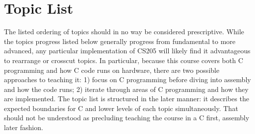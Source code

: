 \documentclass[12pt,letterpaper]{article}
\begin{document}
	\clearpage
	

	\section{Topic List}

		
	

	The listed ordering of topics should in no way be considered prescriptive. While the topics progress listed below generally progress from fundamental to more advanced, any particular implementation of CS205 will likely find it advantageous to rearrange or crosscut topics. In particular, because this course covers both C programming and how C code runs on hardware, there are two possible approaches to teaching it: 1) focus on C programming before diving into assembly and how the code runs; 2) iterate through areas of C programming and how they are implemented. The topic list is structured in the later manner: it describes the expected boundaries for C and lower levels of each topic simultaneously. That should not be understood as precluding teaching the course in a C first, assembly later fashion.
\end{document}
